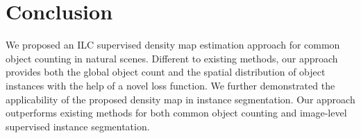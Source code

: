 \documentclass[10pt,twocolumn,letterpaper]{article}
\begin{document}
\vspace{-0.2cm}
\section{Conclusion}
\vspace{-0.1cm}
We proposed an ILC  supervised density map estimation approach for common object counting in natural scenes. Different to existing methods, our approach provides both the global object count and the spatial distribution of object instances with the help of a novel loss function.  We further demonstrated the applicability of the proposed density map in instance segmentation. Our approach outperforms existing methods for both common object counting and image-level supervised instance segmentation.






















{\small


}
\end{document}
